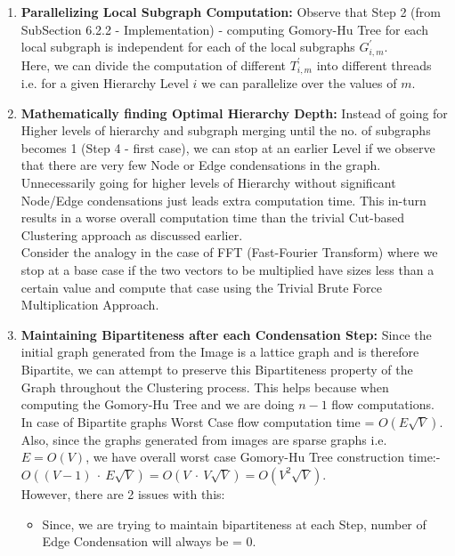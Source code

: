             \begin{enumerate}
                \item {
                    \textbf{Parallelizing Local Subgraph Computation:} Observe that Step 2 (from SubSection 6.2.2 - Implementation) - computing Gomory-Hu Tree for each local subgraph is independent for each of the local subgraphs $G^{'}_{i,m}$. \\ 
                    Here, we can divide the computation of different $T^{'}_{i,m}$ into different threads i.e. for a given Hierarchy Level $i$ we can parallelize over the values of $m$.
                }
                \item{
                    \textbf{Mathematically finding Optimal Hierarchy Depth:} Instead of going for Higher levels of hierarchy and subgraph merging until the no. of subgraphs becomes 1 (Step 4 - first case), we can stop at an earlier Level if we observe that there are very few Node or Edge condensations in the graph. Unnecessarily going for higher levels of Hierarchy without significant Node/Edge condensations just leads extra computation time. This in-turn results in a worse overall computation time than the trivial Cut-based Clustering approach as discussed earlier. \\
                    Consider the analogy in the case of FFT (Fast-Fourier Transform) where we stop at a base case if the two vectors to be multiplied have sizes less than a certain value and compute that case using the Trivial Brute Force Multiplication Approach.                    
                }
                \item{
                    \textbf{Maintaining Bipartiteness after each Condensation Step:} Since the initial graph generated from the Image is a lattice graph and is therefore Bipartite, we can attempt to preserve this Bipartiteness property of the Graph throughout the Clustering process. This helps because when computing the Gomory-Hu Tree and we are doing $n-1$ flow computations. In case of Bipartite graphs Worst Case flow computation time = $O(E\sqrt{V})$. Also, since the graphs generated from images are sparse graphs i.e. $E = O(V)$, we have overall worst case Gomory-Hu Tree construction time:-    $O((V-1)\ \cdot \ E\sqrt{V}) = O(V \ \cdot \ V\sqrt{V}) = O(V^2\sqrt{V})$. \\
                    However, there are 2 issues with this:
                    \begin{itemize}
                        \item {
                            Since, we are trying to maintain bipartiteness at each Step, number of Edge Condensation will always be = 0. \\
}
\end{itemize}}
\end{enumerate}
